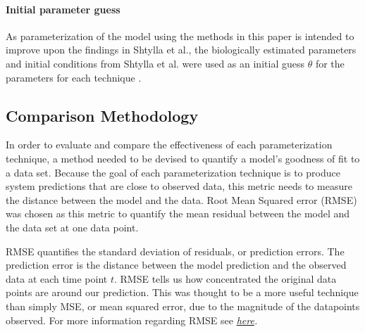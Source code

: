\paragraph{Initial parameter guess}
As parameterization of the model using the methods in this paper is intended to improve upon the findings in Shtylla et al., the biologically estimated parameters and initial conditions from Shtylla et al. were used as an initial guess $\theta$ for the parameters for each technique \cite{shtylla2019mathematical}. 

\subsection{Comparison Methodology} \label{Methodology}
In order to evaluate and compare the effectiveness of each parameterization technique, a method needed to be devised to quantify a model's goodness of fit to a data set. Because the goal of each parameterization technique is to produce system predictions that are close to observed data, this metric needs to measure the distance between the model and the data. Root Mean Squared error (RMSE) was chosen as this metric to quantify the mean residual between the model and the data set at one data point. 
\par RMSE quantifies the standard deviation of residuals, or prediction errors. The prediction error is the distance between the model prediction and the observed data at each time point $t$. RMSE tells us how concentrated the original data points are around our prediction. This was thought to be a more useful technique than simply MSE, or mean squared error, due to the magnitude of the datapoints observed. For more information regarding RMSE see \textit{\href{https://statweb.stanford.edu/~susan/courses/s60/split/node60.html}{here}.}